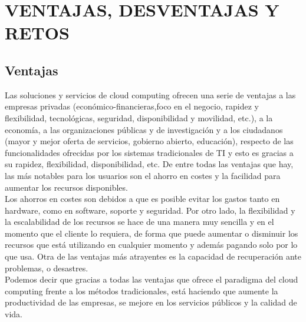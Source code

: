\documentclass[a4paper, 12pt]{report}
\begin{document}
\chapter{VENTAJAS, DESVENTAJAS Y RETOS}
\vspace*{-2em}
\section{Ventajas}
\begin{justify}
Las soluciones y servicios de cloud computing ofrecen una serie de ventajas a las empresas privadas (econ\'omico-financieras,foco en el negocio, rapidez y flexibilidad, tecnol\'ogicas, seguridad, disponibilidad y movilidad, etc.), a la econom\'ia, a las organizaciones p\'ublicas y de investigaci\'on y a los ciudadanos (mayor y mejor oferta de servicios, gobierno abierto, educaci\'on), respecto de las funcionalidades ofrecidas por los sistemas tradicionales de TI y esto es gracias a su rapidez, flexibilidad, disponibilidad, etc. De entre todas las ventajas que hay, las más notables para los usuarios son el ahorro en costes y la facilidad para aumentar los recursos disponibles.
\\ Los ahorros en costes son debidos a que es posible evitar los gastos tanto en hardware, como en software, soporte y seguridad. Por otro lado, la flexibilidad y la escalabilidad de los recursos se hace de una manera muy sencilla y en el momento que el cliente lo requiera, de forma que puede aumentar o disminuir los recursos que está utilizando en cualquier momento y adem\'as pagando solo por lo que usa. Otra de las ventajas m\'as atrayentes es la capacidad de recuperación ante problemas, o desastres.
\\ Podemos decir que gracias a todas las ventajas que ofrece el paradigma del cloud computing frente a los m\'etodos tradicionales, est\'a haciendo que aumente la productividad de las empresas, se mejore en los servicios públicos y la calidad de vida.

\end{justify}
\newpage
\end{document}
